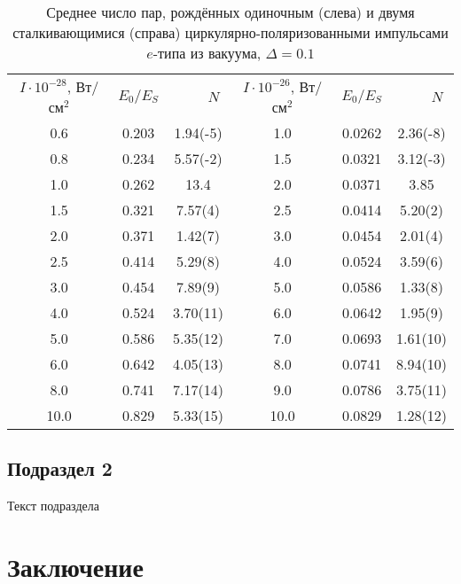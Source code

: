 \documentclass[a4paper,12pt]{article}         %
\begin{document}
\begin{table}[t]
\caption{\label{table1}Среднее число пар, рождённых одиночным
(слева) и двумя сталкивающимися (справа) циркулярно-поляризованными
импульсами $e$-типа из вакуума, $\Delta=0.1$}
\begin{center}
\begin{tabular}{|c|c|c|c|c|c|}
\hline \multirow{2}{2cm}{$I\cdot10^{-28}$,
Вт/см$^2$}&\multirow{2}{2cm}{\quad$E_0/E_S$}&
\multirow{2}{2.5cm}{$\qquad\,
N$}&\multirow{2}{2.5cm}{$I\cdot10^{-26}$, Вт/см$^2$}&
\multirow{2}{2.5cm}{\quad$E_0/E_S$}&\multirow{2}{2.5cm}{$\qquad\, N$}\\
&&&&&\\
\hline   0.6   &  0.203 &    1.94(-5) &1.0     &0.0262   & 2.36(-8)\\
\hline   0.8   &  0.234 &    5.57(-2) &1.5     &0.0321   & 3.12(-3)\\
\hline   1.0   &  0.262 &       13.4  &2.0     &0.0371   &    3.85\\
\hline   1.5   &  0.321 &     7.57(4) &2.5     &0.0414   &  5.20(2)\\
\hline   2.0   &  0.371 &     1.42(7) &3.0     &0.0454   &  2.01(4)\\
\hline   2.5   &  0.414 &     5.29(8) &4.0     &0.0524   &  3.59(6)\\
\hline   3.0   &  0.454 &     7.89(9) &5.0     &0.0586   &  1.33(8)\\
\hline   4.0   &  0.524 &    3.70(11) &6.0     &0.0642   &  1.95(9)\\
\hline   5.0   &  0.586 &    5.35(12) &7.0     &0.0693   & 1.61(10)\\
\hline   6.0   &  0.642 &    4.05(13) &8.0     &0.0741   & 8.94(10)\\
\hline   8.0   &  0.741 &    7.17(14) &9.0     &0.0786   & 3.75(11)\\
\hline  10.0   &  0.829 &    5.33(15) &10.0    &0.0829   & 1.28(12)\\
\hline
\end{tabular}
\end{center}
\end{table}

\subsection{Подраздел 2}

Текст подраздела

\newpage
\section{Заключение}
\end{document}
